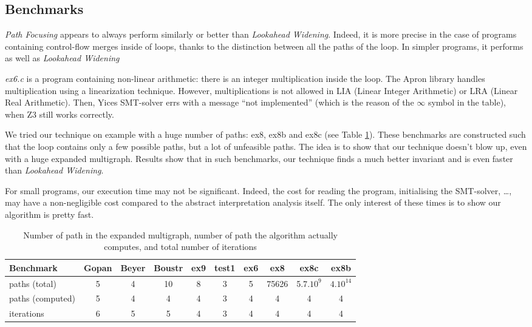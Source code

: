 \documentclass[a4paper,english,titlepage,11pt]{report}
\begin{document}
	\subsection{Benchmarks}

\emph{Path Focusing} appears to always perform similarly or better than 
\emph{Lookahead Widening}. Indeed, it is more precise in the case of programs
containing control-flow merges inside of loops, thanks to the distinction
between all the paths of the loop. In simpler programs, it performs as well as
\emph{Lookahead Widening}

\emph{ex6.c} is a program containing non-linear arithmetic: there is an integer
multiplication inside the loop. The Apron library handles multiplication using
a linearization technique. However, multiplications is not allowed in LIA
(Linear Integer Arithmetic) or LRA (Linear Real Arithmetic). Then, Yices
SMT-solver errs with a message ``not implemented'' (which is the reason of the
$\infty$ symbol in the table), when Z3 still works correctly.

We tried our technique on example with a huge number of paths: ex8, ex8b and
ex8c (see Table \ref{npaths}). These benchmarks are constructed such that the
loop contains only a few
possible paths, but a lot of unfeasible paths. The idea is to show that our
technique doesn't blow up, even with a huge expanded multigraph. Results show
that in such benchmarks, our technique finds a much better invariant and is even
faster than \emph{Lookahead Widening}.

For small programs, our execution time may not be significant. Indeed, the cost
for reading the program, initialising the SMT-solver, \dots, may have a
	non-negligible cost compared to the abstract interpretation analysis itself.
	The only interest of these times is to show our algorithm is pretty fast.

\begin{table}[!h]
\begin{tabular}{|l||c|c|c|c|c|c|c|c|c|} \hline
Benchmark  & Gopan & Beyer & Boustr & ex9 & test1 & ex6 & ex8 &
ex8c & ex8b\\ \hline \hline
paths (total) & 5 & 4 & 10 & 8 & 3 & 5 & 75626 & 5.7$.10^9$ & $4.10^{14}$\\
\hline
paths (computed) & 5 & 4 & 4 & 4 & 3 & 4 & 4 & 4 & 4\\ \hline
iterations  & 6 & 5 & 5 & 4 & 3 & 4 & 4 & 4 & 4\\ \hline
\end{tabular}
\caption{Number of path in the expanded multigraph, number of path the
algorithm actually computes, and total number of iterations}
\label{npaths}
\end{table}
\end{document}
